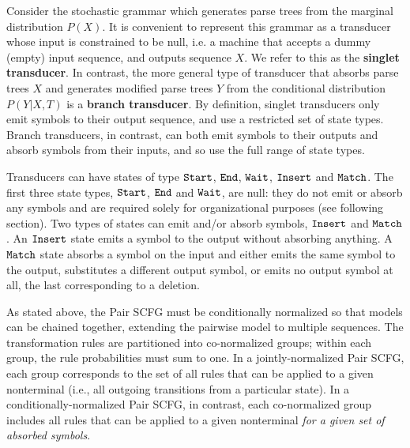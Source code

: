 \documentclass[10pt]{article}
\begin{document}
Consider the stochastic grammar which generates parse trees from the marginal distribution $P(X)$.
It is convenient to represent this grammar as a transducer whose input is constrained to be null,
i.e. a machine that accepts a dummy (empty) input sequence, and outputs sequence $X$.
We refer to this as the {\bf singlet transducer}.
In contrast, the more general type of transducer that absorbs parse trees $X$ and generates modified parse trees $Y$ from the conditional distribution $P(Y | X, T)$ is a {\bf branch transducer}.
By definition, singlet transducers only emit symbols to their output sequence, and use a restricted set of state types.
Branch transducers, in contrast, can both emit symbols to their outputs and absorb symbols from their inputs, and so use the full range of state types.

Transducers can have states of type $\mathtt{Start}$, $\mathtt{End}$,
$\mathtt{Wait}$, $\mathtt{Insert}$ and $\mathtt{Match}$.
The first three state types, $\mathtt{Start}$, $\mathtt{End}$ and $\mathtt{Wait}$, are null:
they do not emit or absorb any symbols and are required solely for
organizational purposes (see following section).
Two types of states can emit and/or absorb symbols, $\mathtt{Insert}$ and $\mathtt{Match}$.
An $\mathtt{Insert}$ state emits a symbol to the output without absorbing anything.
A $\mathtt{Match}$ state absorbs a symbol on the input and either emits
the same symbol to the output, substitutes a different output symbol,
or emits no output symbol at all, the last corresponding to a deletion.

As stated above, the Pair SCFG must be conditionally normalized
so that models can be chained together,
extending the pairwise model to multiple sequences.
The transformation rules are partitioned into co-normalized groups;
within each group, the rule probabilities must sum to one.
In a jointly-normalized Pair SCFG, each group corresponds to the set of all rules that can be applied to a given nonterminal
(i.e., all outgoing transitions from a particular state).
In a conditionally-normalized Pair SCFG, in contrast,
each co-normalized group includes all rules that can be applied to a
given nonterminal {\em for a given set of absorbed symbols}.

\end{document}
